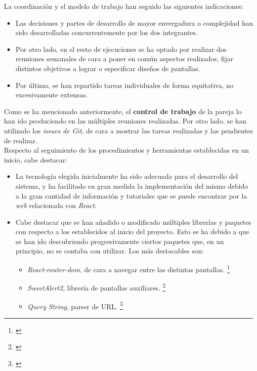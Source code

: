 \documentclass[11pt, a4paper, titlepage]{article}
\begin{document}
La coordinación y el modelo de trabajo han seguido las siguientes indicaciones:

\begin{itemize}
    \item Las decisiones y partes de desarrollo de mayor envergadura o complejidad han sido desarrolladas concurrentemente por los dos integrantes. 
    \item Por otro lado, en el resto de ejecuciones se ha optado por realizar dos reuniones semanales de cara a poner en común aspectos realizados, fijar distintos objetivos a lograr o especificar diseños de pantallas.
    \item Por último, se han repartido tareas individuales de forma equitativa, no excesivamente extensas.
\end{itemize}

Como se ha mencionado anteriormente, el \textbf{control de trabajo} de la pareja lo han ido produciendo en las múltiples reuniones realizadas. Por otro lado, se han utilizado los \textit{issues de Git}, de cara a mostrar las tareas realizadas y las pendientes de realizar. \\

Respecto al seguimiento de los procedimientos y herramientas establecidas en un inicio, cabe destacar:

\begin{itemize}
    \item La tecnología elegida inicialmente ha sido adecuada para el desarrollo del sistema, y ha facilitado en gran medida la implementación del mismo debido a la gran cantidad de información y tutoriales que se puede encontrar por la \textit{web} relacionada con \textit{React}.

    \item Cabe destacar que se han añadido o modificado múltiples librerías y paquetes con respecto a los establecidos al inicio del proyecto. Esto se ha debido a que se han ido descubriendo progresivamente ciertos paquetes que, en un principio, no se contaba con utilizar. Los más destacables son:
        \begin{itemize}
            \item \textit{React-router-dom}, de cara a navegar entre las distintas pantallas. \footnote{\href{https://v5.reactrouter.com/web/guides/quick-start}{}}
            \item \textit{SweetAlert2}, librería de pantallas auxiliares.
            \footnote{\href{https://sweetalert2.github.io}{}}
            \item \textit{Query String}, parser de URL.
            \footnote{\href{https://www.npmjs.com/package/query-string}{}}
        \end{itemize}
\end{itemize}
\end{document}
